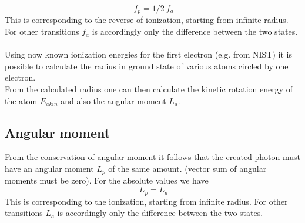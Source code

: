 \documentclass[10pt,titlepage]{article}
\begin{document}
\begin{equation}
\ f_p = 1/2  \  f_a
\end{equation}
This is corresponding to the reverse of ionization, starting from infinite radius.
For other transitions $f_a$ is accordingly only the difference between the two states. 
\\\\
Using now known ionization energies for the first electron (e.g. from NIST) it is possible to calculate the radius in ground state of various atoms circled by one electron. 
\\
From the calculated radius one can then calculate the kinetic rotation energy of the atom $E_{akin}$ and also the angular moment $L_a$.
\\


\subsection{Angular moment}
From the conservation of angular moment it follows that the created photon must have an angular moment $L_p$ of the same amount. (vector sum of angular moments must be zero). For the absolute values we have
\\
\begin{equation}
\ L_p = L_a
\end{equation}
This is corresponding to the ionization, starting from infinite radius.
For other transitions $L_a$ is accordingly only the difference between the two states. 

\end{document}
